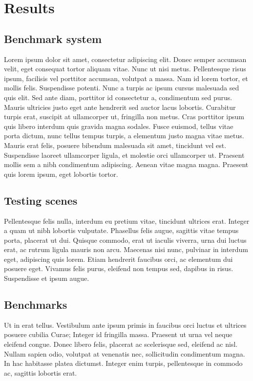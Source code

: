 \chapter{Results}
\label{ch:results}
\section{Benchmark system}
Lorem ipsum dolor sit amet, consectetur adipiscing elit. Donec semper accumsan velit, eget consequat tortor aliquam vitae. Nunc ut nisi metus. Pellentesque risus ipsum, facilisis vel porttitor accumsan, volutpat a massa. Nam id lorem tortor, et mollis felis. Suspendisse potenti. Nunc a turpis ac ipsum cursus malesuada sed quis elit. Sed ante diam, porttitor id consectetur a, condimentum sed purus. Mauris ultricies justo eget ante hendrerit sed auctor lacus lobortis. Curabitur turpis erat, suscipit at ullamcorper ut, fringilla non metus. Cras porttitor ipsum quis libero interdum quis gravida magna sodales. Fusce euismod, tellus vitae porta dictum, nunc tellus tempus turpis, a elementum justo magna vitae metus. Mauris erat felis, posuere bibendum malesuada sit amet, tincidunt vel est. Suspendisse laoreet ullamcorper ligula, et molestie orci ullamcorper ut. Praesent mollis sem a nibh condimentum adipiscing. Aenean vitae magna magna. Praesent quis lorem ipsum, eget lobortis tortor.
\section{Testing scenes}
Pellentesque felis nulla, interdum eu pretium vitae, tincidunt ultrices erat. Integer a quam ut nibh lobortis vulputate. Phasellus felis augue, sagittis vitae tempus porta, placerat ut dui. Quisque commodo, erat ut iaculis viverra, urna dui luctus erat, ac rutrum ligula mauris non arcu. Maecenas nisi nunc, pulvinar in interdum eget, adipiscing quis lorem. Etiam hendrerit faucibus orci, ac elementum dui posuere eget. Vivamus felis purus, eleifend non tempus sed, dapibus in risus. Suspendisse et ipsum augue.
\section{Benchmarks}
Ut in erat tellus. Vestibulum ante ipsum primis in faucibus orci luctus et ultrices posuere cubilia Curae; Integer id fringilla massa. Praesent ut urna vel neque eleifend congue. Donec libero felis, placerat ac scelerisque sed, eleifend ac nisl. Nullam sapien odio, volutpat at venenatis nec, sollicitudin condimentum magna. In hac habitasse platea dictumst. Integer enim turpis, pellentesque in commodo ac, sagittis lobortis erat.
\label{ch:results:sec:benchmarks}